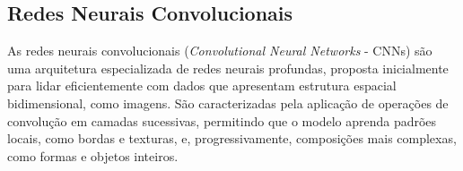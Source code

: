 \documentclass[12pt]{article}
\begin{document}

\subsection{Redes Neurais Convolucionais}
\label{sec:review:cnn}

As redes neurais convolucionais (\emph{Convolutional Neural Networks} - CNNs) são uma arquitetura especializada de redes neurais profundas, proposta inicialmente para lidar eficientemente com dados que apresentam estrutura espacial bidimensional, como imagens. \cite{lecun1998gradient} São caracterizadas pela aplicação de operações de convolução em camadas sucessivas, permitindo que o modelo aprenda padrões locais, como bordas e texturas, e, progressivamente, composições mais complexas, como formas e objetos inteiros.
\end{document}
